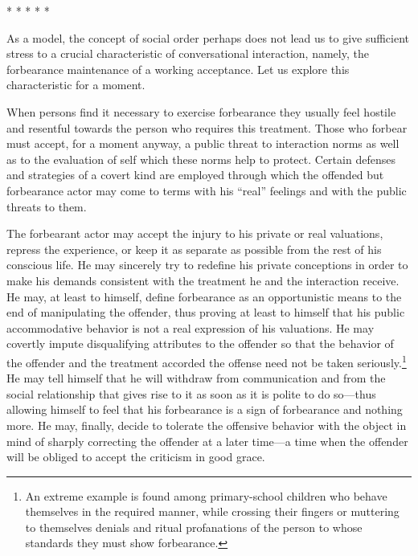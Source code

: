 \documentclass[openany,nobib]{tufte-book}
\begin{document}
\vspace{.2in}
\begin{centering}

\Large{* * * * *}

\end{centering}
\vspace{.17in}

\noindent 

As a model, the concept of social order perhaps does not lead us to give
sufficient stress to a crucial characteristic of conversational
interaction, namely, the forbearance maintenance of a working
acceptance. Let us explore this characteristic for a moment.

When persons find it necessary to exercise forbearance they usually feel
hostile and resentful towards the person who requires this treatment.
Those who forbear must accept, for a moment anyway, a public threat to
interaction norms as well as to the evaluation of self which these norms
help to protect. Certain defenses and strategies of a covert kind are
employed through which the offended but forbearance actor may come to
terms with his ``real'' feelings and with the public threats to them.

The forbearant actor may accept the injury to his private or real
valuations, repress the experience, or keep it as separate as possible
from the rest of his conscious life. He may sincerely try to redefine
his private conceptions in order to make his demands consistent with the
treatment he and the interaction receive. He may, at least to himself,
define forbearance as an opportunistic means to the end of manipulating
the offender, thus proving at least to himself that his public
accommodative behavior is not a real expression of his valuations. He
may covertly impute disqualifying attributes to the offender so that the
behavior of the offender and the treatment accorded the offense need not
be taken seriously.\footnote{An extreme example is found among
  primary-school children who behave themselves in the required manner,
  while crossing their fingers or muttering to themselves denials and
  ritual profanations of the person to whose standards they must show
  forbearance.} He may tell himself that he will withdraw from
communication and from the social relationship that gives rise to it as
soon as it is polite to do so---thus allowing himself to feel that his
forbearance is a sign of forbearance and nothing more. He may, finally,
decide to tolerate the offensive behavior with the object in mind of
sharply correcting the offender at a later time---a time when the
offender will be obliged to accept the criticism in good grace.
\end{document}
